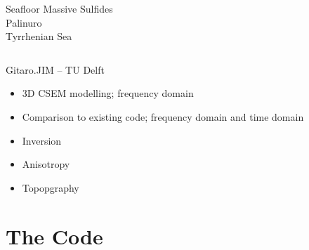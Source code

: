 \documentclass[xcolor=svgnames, aspectratio=169]{beamer}
\begin{document}
\begin{frame}[t]
\begin{columns}[t]
        \centering
        \alert{Seafloor Massive Sulfides}\\
        Palinuro\\
        Tyrrhenian Sea\\[1cm]
    \end{columns}
  \end{frame}

  \begin{frame}%
    {Gitaro.JIM -- TU Delft}
    \begin{itemize}\itemsep.6cm
      \item 3D CSEM modelling; frequency domain
      \item Comparison to existing code; frequency domain and time domain
      \item Inversion
      \item Anisotropy
      \item Topopgraphy
    \end{itemize}
  \end{frame}

  \section{The Code} %
\end{document}
